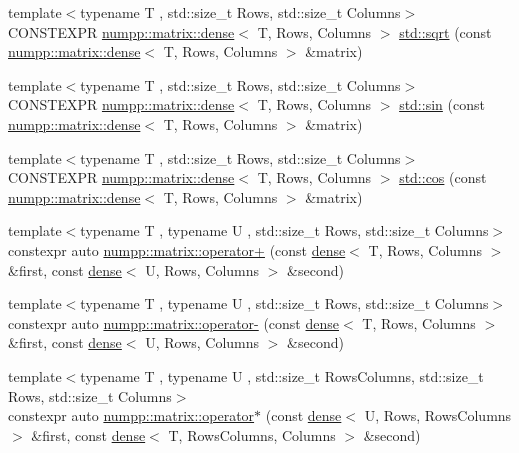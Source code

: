 \begin{DoxyCompactItemize}
\item 
{\footnotesize template$<$typename T , std\+::size\+\_\+t Rows, std\+::size\+\_\+t Columns$>$ }\\C\+O\+N\+S\+T\+E\+X\+PR \hyperlink{classnumpp_1_1matrix_1_1dense}{numpp\+::matrix\+::dense}$<$ T, Rows, Columns $>$ \hyperlink{group__numpp__structures__matrices__dense_gac89face89afdd17bfd0c07fda3997db2}{std\+::sqrt} (const \hyperlink{classnumpp_1_1matrix_1_1dense}{numpp\+::matrix\+::dense}$<$ T, Rows, Columns $>$ \&matrix)
\item 
{\footnotesize template$<$typename T , std\+::size\+\_\+t Rows, std\+::size\+\_\+t Columns$>$ }\\C\+O\+N\+S\+T\+E\+X\+PR \hyperlink{classnumpp_1_1matrix_1_1dense}{numpp\+::matrix\+::dense}$<$ T, Rows, Columns $>$ \hyperlink{group__numpp__structures__matrices__dense_ga3cccd3987b35936ecd0368f9dc4d6832}{std\+::sin} (const \hyperlink{classnumpp_1_1matrix_1_1dense}{numpp\+::matrix\+::dense}$<$ T, Rows, Columns $>$ \&matrix)
\item 
{\footnotesize template$<$typename T , std\+::size\+\_\+t Rows, std\+::size\+\_\+t Columns$>$ }\\C\+O\+N\+S\+T\+E\+X\+PR \hyperlink{classnumpp_1_1matrix_1_1dense}{numpp\+::matrix\+::dense}$<$ T, Rows, Columns $>$ \hyperlink{group__numpp__structures__matrices__dense_gaf4c3368b8cb2cdb05c0dd5a4d1790480}{std\+::cos} (const \hyperlink{classnumpp_1_1matrix_1_1dense}{numpp\+::matrix\+::dense}$<$ T, Rows, Columns $>$ \&matrix)
\item 
{\footnotesize template$<$typename T , typename U , std\+::size\+\_\+t Rows, std\+::size\+\_\+t Columns$>$ }\\constexpr auto \hyperlink{group__numpp__structures__matrices__dense_ga9fdd727151e15fa8f6a806b9828d06d4}{numpp\+::matrix\+::operator+} (const \hyperlink{classnumpp_1_1matrix_1_1dense}{dense}$<$ T, Rows, Columns $>$ \&first, const \hyperlink{classnumpp_1_1matrix_1_1dense}{dense}$<$ U, Rows, Columns $>$ \&second)
\item 
{\footnotesize template$<$typename T , typename U , std\+::size\+\_\+t Rows, std\+::size\+\_\+t Columns$>$ }\\constexpr auto \hyperlink{group__numpp__structures__matrices__dense_ga1a99075b6985b2ccafb41a6d9ad91824}{numpp\+::matrix\+::operator-\/} (const \hyperlink{classnumpp_1_1matrix_1_1dense}{dense}$<$ T, Rows, Columns $>$ \&first, const \hyperlink{classnumpp_1_1matrix_1_1dense}{dense}$<$ U, Rows, Columns $>$ \&second)
\item 
{\footnotesize template$<$typename T , typename U , std\+::size\+\_\+t Rows\+Columns, std\+::size\+\_\+t Rows, std\+::size\+\_\+t Columns$>$ }\\constexpr auto \hyperlink{group__numpp__structures__matrices__dense_ga9f59a9112db4704ed081eaf0c2b738b5}{numpp\+::matrix\+::operator$\ast$} (const \hyperlink{classnumpp_1_1matrix_1_1dense}{dense}$<$ U, Rows, Rows\+Columns $>$ \&first, const \hyperlink{classnumpp_1_1matrix_1_1dense}{dense}$<$ T, Rows\+Columns, Columns $>$ \&second)

\end{DoxyCompactItemize}

